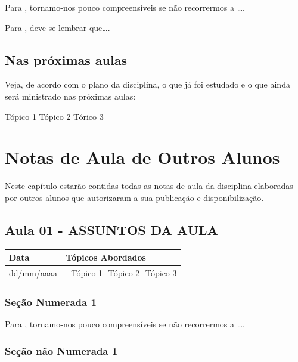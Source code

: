 \documentclass[
]{book}
\begin{document}
Para \citet{BOCK2001}, tornamo-nos pouco compreensíveis se não recorrermos a \ldots.

Para \citet{DAVIDOFF2001}, deve-se lembrar que\ldots.

\hypertarget{nas-pruxf3ximas-aulas-6}{%
\section{Nas próximas aulas}\label{nas-pruxf3ximas-aulas-6}}

Veja, de acordo com o plano da disciplina, o que já foi estudado e o que ainda será ministrado nas próximas aulas:

Tópico 1
Tópico 2
Tórico 3

\hypertarget{notas-de-aula-de-outros-alunos-1}{%
\chapter{Notas de Aula de Outros Alunos}\label{notas-de-aula-de-outros-alunos-1}}

Neste capítulo estarão contidas todas as notas de aula da disciplina elaboradas por outros alunos que autorizaram a sua publicação e disponibilização.

\hypertarget{aula-01---assuntos-da-aula-4}{%
\section{Aula 01 - ASSUNTOS DA AULA}\label{aula-01---assuntos-da-aula-4}}

\begin{longtable}[]{@{}ll@{}}
\toprule()
Data & Tópicos Abordados \\
\midrule()
\endhead
dd/mm/aaaa & - Tópico 1- Tópico 2- Tópico 3 \\
\bottomrule()
\end{longtable}

\hypertarget{seuxe7uxe3o-numerada-1-17}{%
\subsection{Seção Numerada 1}\label{seuxe7uxe3o-numerada-1-17}}

Para \citet{BOCK2001}, tornamo-nos pouco compreensíveis se não recorrermos a \ldots.

\hypertarget{seuxe7uxe3o-nuxe3o-numerada-1-34}{%
\subsection*{Seção não Numerada 1}\label{seuxe7uxe3o-nuxe3o-numerada-1-34}}
\end{document}
